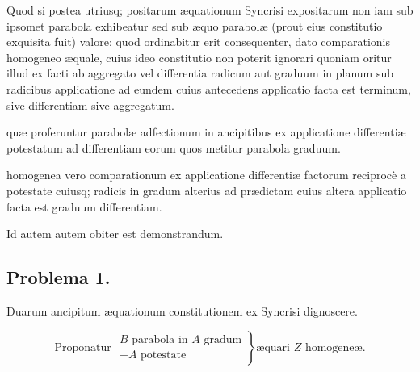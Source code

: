 \documentclass[11pt,a4paper]{article}
\begin{document}
Quod si postea utriusq; positarum æquationum Syncrisi expositarum non iam sub ipsomet parabola exhibeatur sed sub æquo parabolæ (prout eius constitutio exquisita fuit) valore: quod ordinabitur erit consequenter, dato comparationis homogeneo æquale, cuius ideo constitutio non poterit ignorari quoniam oritur illud ex facti ab aggregato vel differentia radicum aut graduum in planum sub radicibus applicatione ad eundem cuius antecedens applicatio facta est terminum, sive differentiam sive aggregatum.

 quæ proferuntur parabolæ adfectionum in ancipitibus ex applicatione differentiæ potestatum ad differentiam eorum quos metitur parabola graduum.

homogenea vero comparationum ex applicatione differentiæ factorum reciprocè a potestate cuiusq; radicis in gradum alterius ad prædictam cuius altera applicatio facta est graduum differentiam.

Id autem autem obiter est demonstrandum.

\subsection*{Problema 1.}

Duarum ancipitum æquationum constitutionem ex Syncrisi dignoscere.

\[ \text{Proponatur } \left.\begin{array}{l} B \text{ parabola in } A \text{ gradum} \\ - A \text{ potestate} \end{array}\right\} \text{æquari } Z \text{ homogeneæ.} \]

\end{document}
